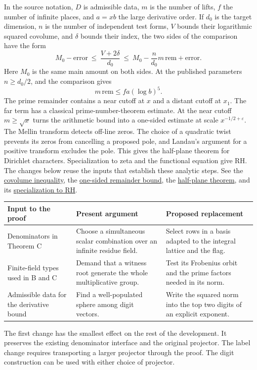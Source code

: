 \documentclass[11pt,letterpaper]{article}
\newcommand{\src}[3]{\href{https://github.com/VladimirReshetnikov/ProveIt/blob/89d12dd40424f1217fd818d84877b3da52396a3b/Analysis/GeneralizedRiemannHypothesis/Lean/grh/src/#1.lean\#L#2}{#3}}
\begin{document}
In the source notation, $D$ is admissible data, $m$ is the number of lifts, $f$ the number of infinite places, and $a=xb$ the large derivative order. If $d_0$ is the target dimension, $n$ is the number of independent test forms, $V$ bounds their logarithmic squared covolume, and $\delta$ bounds their index, the two sides of the comparison have the form
\[
 M_0-\text{error}\ \le\ \frac{V+2\delta}{d_0}
 \ \le\ M_0-\frac{n}{d_0}m\,\mathrm{rem}+\text{error}.
\]
Here $M_0$ is the same main amount on both sides. At the published parameters $n\ge d_0/2$, and the comparison gives
\[
                  m\,\mathrm{rem}\le f a(\log b)^5.
\]
The prime remainder contains a near cutoff at $x$ and a distant cutoff at $x_1$. The far term has a classical prime-number-theorem estimate. At the near cutoff $m\ge\sqrt x$ turns the arithmetic bound into a one-sided estimate at scale $x^{-1/2+\varepsilon}$. The Mellin transform detects off-line zeros. The choice of a quadratic twist prevents its zeros from cancelling a proposed pole, and Landau's argument for a positive transform excludes the pole. This gives the half-plane theorem for Dirichlet characters. Specialization to zeta and the functional equation give RH. The changes below reuse the inputs that establish these analytic steps. See the \src{New/Reduction/MainInequality}{87}{covolume inequality}, the \src{New/Reduction/OneSidedBound}{200}{one-sided remainder bound}, the \src{New/Reduction/OneSidedBound}{239}{half-plane theorem}, and its \src{Main}{5}{specialization to RH}.

\begin{center}\small
\begin{tabularx}{\linewidth}{@{}p{.23\linewidth}XX@{}}\toprule
Input to the proof & Present argument & Proposed replacement\\\midrule
Denominators in Theorem C & Choose a simultaneous scalar combination over an infinite residue field. & Select rows in a basis adapted to the integral lattice and the flag.\\[3pt]
Finite-field types used in B and C & Demand that a witness root generate the whole multiplicative group. & Test its Frobenius orbit and the prime factors needed in its norm.\\[3pt]
Admissible data for the derivative bound & Find a well-populated sphere among digit vectors. & Write the squared norm into the top two digits of an explicit exponent.\\\bottomrule
\end{tabularx}\end{center}
The first change has the smallest effect on the rest of the development. It preserves the existing denominator interface and the original projector. The label change requires transporting a larger projector through the proof. The digit construction can be used with either choice of projector.
\end{document}
